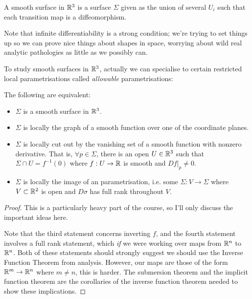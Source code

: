 \documentclass[11pt]{scrartcl}
\begin{document}
\begin{definition}

A smooth surface in $\mathbb R^3$ is a surface $\Sigma$ given as the union of several $U_i$ such that each transition map is a diffeomorphism.
\end{definition}

\begin{remark}
Note that infinite differentiability is a strong condition; we're trying to set things up so we can prove nice things about shapes in space, worrying about wild real analytic pathologies as little as we possibly can.
\end{remark}

To study smooth surfaces in $\mathbb R^3$, actually we can specialise to certain restricted local parametrisations called \textit{allowable} parametrisations:

\begin{theorem}
The following are equivalent:

\begin{itemize}
    \item $\Sigma$ is a smooth surface in $\mathbb R^3$. 
    \item $\Sigma$ is locally the graph of a smooth function over one of the coordinate planes.
    \item $\Sigma$ is locally cut out by the vanishing set of a smooth function with nonzero derivative. That is, $\forall p \in \Sigma$, there is an open $U \in \mathbb R^3$ such that $\Sigma \cap U = f^{-1}(0)$ where $f : U \rightarrow \mathbb R$ is smooth and $Df|_p \neq 0$.
    \item $\Sigma$ is locally the image of an  parametrisation, i.e. some $\Sigma : V \rightarrow \Sigma$ where $V \subset \mathbb R^2$ is open and $D \sigma$ has full rank throughout $V$.
\end{itemize}

\begin{proof}
    This is a particularly heavy part of the course, so I'll only discuss the important ideas here.

    Note that the third statement concerns inverting $f$, and the fourth statement involves a full rank statement, which \textit{if} we were working over maps from $\mathbb R^n$ to $\mathbb R^n$. Both of these statements should strongly suggest we should use the Inverse Function Theorem from analysis. However, our maps are those of the form $\mathbb R^m \rightarrow \mathbb R^n$ where $m \neq n$, this is harder. The submersion theorem and the implicit function theorem are the corollaries of the inverse function theorem needed to show these implications.

\end{proof}
\end{theorem}
\end{document}
